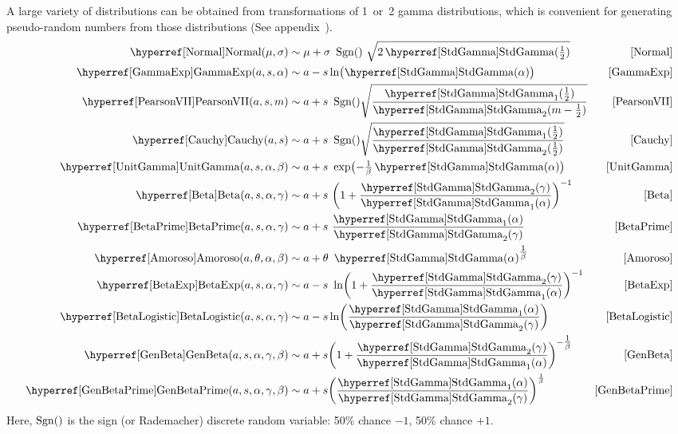 A large variety of distributions can be obtained from transformations of 1~or~2 gamma distributions, which is convenient for generating pseudo-random numbers from those distributions (See appendix~). \label{gammatransforms}
\begin{align*}
\opr{Normal}(\mu,\sigma)   &\sim  \mu+ \sigma\ \op{Sgn}()\ \sqrt{ 2 \opr{StdGamma}(\half) } 		& \eqref{Normal}
\checked
\\
\opr{GammaExp}(a,s,\alpha) &\sim a - s \ln\bigl(\opr{StdGamma}(\alpha)\bigr) 		& \eqref{GammaExp} \checked
\\
\opr{PearsonVII}(a,s, m) & \sim a + s\ \op{Sgn}() \sqrt{ \frac{ \opr{StdGamma}_1(\half)}{\opr{StdGamma}_2(m-\half) } }		 \hspace{-1.5em}& \eqref{PearsonVII} 
\checked
\\
 \opr{Cauchy}(a,s) & \sim a + s\ \op{Sgn}() \sqrt{\frac{\opr{StdGamma}_1(\half)}{\opr{StdGamma}_2(\half) } } 		& \eqref{Cauchy} \checked %
\\
\opr{UnitGamma}(a,s,\alpha,\beta) &\sim a+ s\ \exp  \bigl(- \tfrac{1}{\beta}\opr{StdGamma}(\alpha)\bigr)		& \eqref{UnitGamma} \checked
\\
\opr{Beta}(a,s,\alpha,\gamma) & 
\sim a + s\   \Left(1 + \frac{\opr{StdGamma}_2(\gamma)}{\opr{StdGamma}_1(\alpha)} \Right)^{-1}
& \eqref{Beta} \checked 
\\
\opr{BetaPrime}(a,s,\alpha,\gamma) &\sim  a + s\ \frac{\opr{StdGamma}_1(\alpha)}{\opr{StdGamma}_2(\gamma) }		& \eqref{BetaPrime}
\checked
\\
\opr{Amoroso}(a,\theta,\alpha,\beta)&\sim a + \theta\ \opr{StdGamma}(\alpha)^{\tfrac{1}{\beta}}		& \eqref{Amoroso}
\checked
\\
\opr{BetaExp}(a,s, \alpha,\gamma)  & 
\sim a - s\ \ln   \Left(1 + \frac{\opr{StdGamma}_2(\gamma)}{\opr{StdGamma}_1(\alpha)} \Right)^{-1}	
& \eqref{BetaExp} \checked  
\\
\opr{BetaLogistic}(a,s,\alpha,\gamma) &\sim  a - s \ln \Left(\frac{\opr{StdGamma}_1(\alpha)}{\opr{StdGamma}_2(\gamma) } \Right)		& \eqref{BetaLogistic} \checked
\\
\opr{GenBeta}(a,s,\alpha,\gamma,\beta) &
 \sim a + s  \Left(1 + \frac{\opr{StdGamma}_2(\gamma)}{\opr{StdGamma}_1(\alpha)} \Right)^{-\tfrac{1}{\beta}}		& \eqref{GenBeta} \checked
\\
\opr{GenBetaPrime}(a,s,\alpha,\gamma,\beta) & \sim  a+ s \Left( \frac{\opr{StdGamma}_1(\alpha)}{\opr{StdGamma}_2(\gamma) }\Right)^{\frac{1}{\beta}}		& \eqref{GenBetaPrime}
\checked 
\end{align*}
Here, $\operatorname{Sgn}()$ is the sign (or Rademacher) discrete random variable: 50\% chance $-1$, 50\% chance $+1$.

